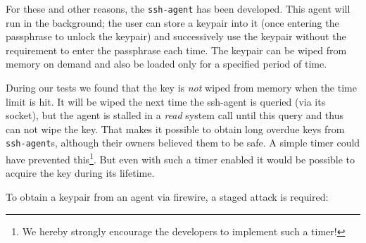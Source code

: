 For these and other reasons, the \texttt{ssh-agent} has been developed. This
agent will run in the background; the user can store a keypair into it (once
entering the passphrase to unlock the keypair) and successively use the keypair
without the requirement to enter the passphrase each time. The keypair can be
wiped from memory on demand and also be loaded only for a specified period of
time.

During our tests we found that the key is \emph{not} wiped from memory when the
time limit is hit. It will be wiped the next time the ssh-agent is queried (via
its socket), but the agent is stalled in a \emph{read} system call until this
query and thus can not wipe the key. That makes it possible to obtain long
overdue keys from \texttt{ssh-agent}s, although their owners believed them to be
safe. A simple timer could have prevented this\footnote{We hereby strongly
encourage the developers to implement such a timer!}. But even with such a timer
enabled it would be possible to acquire the key during its lifetime.

To obtain a keypair from an agent via firewire, a staged attack is required:



